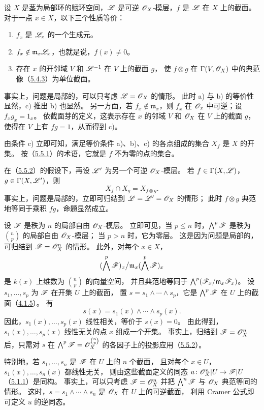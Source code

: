 设 $X$ 是茎为局部环的赋环空间，$\mathscr L$ 是可逆 $\mathscr O_X$-模层，$f$ 是 $\mathscr L$ 在 $X$ 上的截面。
对于一点 $x\in X$，以下三个性质等价：
\begin{enumerate}[label=\alph*)]
\item $f_x$ 是 $\mathscr L_x$ 的一个生成元。
\item $f_x\notin\mathfrak m_x\mathscr L_x$，也就是说，$f(x)\ne0$。
\item 存在 $x$ 的开邻域 $V$ 和 $\mathscr L^{-1}$ 在 $V$ 上的截面 $g$，
使 $f\otimes g$ 在 $\Gamma(V,\mathscr O_X)$ 中的典范像（\hyperlink{para:0:5.4.3}{5.4.3}）为单位截面。
\end{enumerate}
事实上，问题是局部的，可以只考虑 $\mathscr L=\mathscr O_X$ 的情形。
此时 a) 与 b) 的等价性显然，c) 推出 b) 也显然。
另一方面，若 $f_x\notin\mathfrak m_x$，则 $f_x$ 在 $\mathscr O_x$ 中可逆；设 $f_xg_x=1_x$。
依截面芽的定义，这表示存在 $x$ 的邻域 $V$ 和 $\mathscr O_X$ 在 $V$ 上的截面 $g$，
使得在 $V$ 上有 $fg=1$，从而得到 c)。

由条件 c) 立即可知，满足等价条件 a)、b)、c) 的各点组成的集合 $X_f$ 是 $X$ 的开集。
按（\hyperlink{para:0:5.5.1}{5.5.1}）的术语，它就是 $f$ 不为零的点的集合。

在（\hyperlink{para:0:5.5.2}{5.5.2}）的假设下，再设 $\mathscr L'$ 为另一个可逆 $\mathscr O_X$-模层。
若 $f\in\Gamma(X,\mathscr L)$，$g\in\Gamma(X,\mathscr L')$，则
\[
 X_f\cap X_g=X_{f\otimes g}.
\]
事实上，问题是局部的，立即可归结到 $\mathscr L=\mathscr L'=\mathscr O_X$ 的情形；
此时 $f\otimes g$ 典范地等同于乘积 $fg$，命题显然成立。

设 $\mathscr F$ 是秩为 $n$ 的局部自由 $\mathscr O_X$-模层。
立即可见，当 $p\leq n$ 时，$\bigwedge^p\mathscr F$ 是秩为 $\binom np$ 的局部自由 $\mathscr O_X$-模层；
当 $p>n$ 时，它为零层。
这是因为问题是局部的，可归结到 $\mathscr F=\mathscr O_X^n$ 的情形。
此外，对每个 $x\in X$，
\[
 (\bigwedge^p\mathscr F)_x\big/\mathfrak m_x(\bigwedge^p\mathscr F)_x
\]
是 $k(x)$ 上维数为 $\binom np$ 的向量空间，
并且典范地等同于 $\bigwedge^p(\mathscr F_x/\mathfrak m_x\mathscr F_x)$。
设 $s_1,\ldots,s_p$ 为 $\mathscr F$ 在开集 $U$ 上的截面，
置 $s=s_1\wedge\cdots\wedge s_p$，它是 $\bigwedge^p\mathscr F$ 在 $U$ 上的截面（\hyperlink{para:0:4.1.5}{4.1.5}）。
有
\[
 s(x)=s_1(x)\wedge\cdots\wedge s_p(x).
\]
因此，$s_1(x),\ldots,s_p(x)$ 线性相关，等价于 $s(x)=0$。
由此得到，$s_1(x),\ldots,s_p(x)$ 线性无关的点 $x$ 组成一个开集。
事实上，归结到 $\mathscr F=\mathscr O_X^n$ 后，只需对 $s$ 在
$\bigwedge^p\mathscr F=\mathscr O_X^{\binom np}$ 的各因子上的投影应用（\hyperlink{para:0:5.5.2}{5.5.2}）。

特别地，若 $s_1,\ldots,s_n$ 是 $\mathscr F$ 在 $U$ 上的 $n$ 个截面，
且对每个 $x\in U$，$s_1(x),\ldots,s_n(x)$ 都线性无关，
则由这些截面定义的同态 $u\colon\mathscr O_X^n|U\to\mathscr F|U$（\hyperlink{para:0:5.1.1}{5.1.1}）是同构。
事实上，可以只考虑 $\mathscr F=\mathscr O_X^n$ 并把 $\bigwedge^n\mathscr F$ 与 $\mathscr O_X$ 典范等同的情形。
这时，$s=s_1\wedge\cdots\wedge s_n$ 是 $\mathscr O_X$ 在 $U$ 上的可逆截面，
利用 Cramer 公式即可定义 $u$ 的逆同态。

